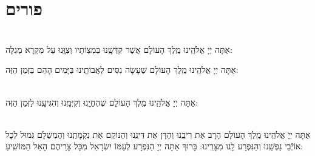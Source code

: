 \documentclass[twoside, openany, parskip=half, 11pt]{book}
\begin{document}
\vfill
\sepline

\chapter[פורים]{ פורים }

\label{purim}

\\
 אַתָּה יְיָ אֱלֹהֵֽינוּ מֶֽלֶךְ הָעוֹלָם 
אֲשֶׁר קִדְּֿשָֽׁנוּ בְּמִצְוֹתָיו וְצִוָּֽנוּ עַל מִקְרָא מְגִלָּה:


 אַתָּה יְיָ אֱלֹהֵֽינוּ מֶֽלֶךְ הָעוֹלָם שֶׁעָשָׂה נִסִּים לַאֲבוֹתֵֽינוּ בַּיָּמִים הָהֵם בַּזְּמַן הַזֶּה:

\\
 אַתָּה יְיָ אֱלֹהֵֽינוּ מֶֽלֶךְ הָעוֹלָם שֶׁהֶחֱיָֽנוּ וְקִיְּמָֽנוּ וְהִגִּיעָֽנוּ לַזְּמַן הַזֶּה:


	\\
	 אַתָּה יְיָ אֱלֹהֵֽינוּ מֶֽלֶךְ הָעוֹלָם הָרָב אֶת רִיבֵֽנוּ וְהַדָּן אֶת דִּינֵֽנוּ וְהַנּוֹקֵם אֶת נִקְמָתֵֽנוּ וְהַמְשַׁלֵּם גְּמוּל לְכָל אוֹיְֿבֵי נַפְשֵֽׁנוּ וְהַנִּפְרָע לָֽנוּ מִצָּרֵֽינוּ: בָּרוּךְ אַתָּה יְיָ הַנִּפְרָע לְעַמּוֹ יִשְׂרָאֵל מִכָּל צָרֵיהֶם הָאֵל הַמּוֹשִֽׁיעַ:
	
\end{document}
